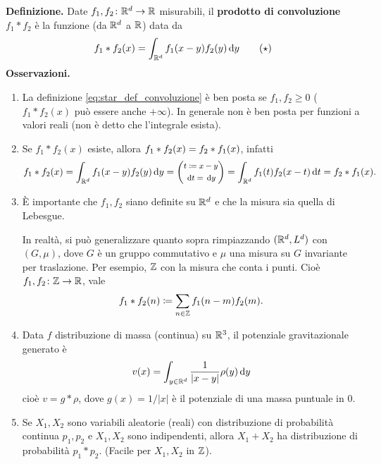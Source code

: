 \documentclass[a4paper, 12pt]{report}
\begin{document}
\textbf{Definizione.} Date $f_1,f_2 \colon  \mathbb R^d \to \mathbb R$ misurabili, il \textbf{prodotto di convoluzione} $f_1 \ast f_2$ è la funzione (da $\mathbb R^d$ a $\mathbb R$) data da
%
\begin{equation} \label{eq:star_def_convoluzione}
	f_1 \ast f_2(x) = \int_{\mathbb R^d} f_1(x-y) f_2(y) \,\mathrm{d} y
	\tag{$\star$}
\end{equation}
%
\textbf{Osservazioni.}
\begin{enumerate}
\item La definizione \eqref{eq:star_def_convoluzione} è ben posta se $f_1,f_2 \geq 0$ ($f_1 \ast f_2(x)$ può essere anche $+\infty$).
In generale non è ben posta per funzioni a valori reali (non è detto che l'integrale esista).

\item Se $f_1 \ast f_2(x)$ esiste, allora $\displaystyle f_1 \ast f_2(x) = f_2 \ast f_1(x)$, infatti
%
$$
f_1 \ast f_2 (x) 
= \int_{\mathbb R^d} f_1(x-y) f_2(y) \,\mathrm{d} y 
= \left( 
{\footnotesize \begin{gathered}
	t \coloneqq x - y \\ 
	\,\mathrm{d} t = \,\mathrm{d} y
\end{gathered}}
\right) =
\int_{\mathbb R^d} f_1(t) f_2(x-t) \,\mathrm{d} t 
= f_2 \ast f_1(x).
$$
%

\item È importante che $f_1,f_2$ siano definite su $\mathbb R^d$ e che la misura sia quella di Lebesgue.

In realtà, si può generalizzare quanto sopra rimpiazzando $(\mathbb R^d, L^d)$ con $(G,\mu)$, dove $G$ è un gruppo commutativo e $\mu$ una misura su $G$ invariante per traslazione. Per esempio, $\mathbb Z$ con la misura che conta i punti. Cioè $f_1,f_2 \colon \mathbb Z \to \mathbb R$, vale
%
$$
f_1 \ast f_2(n) \coloneqq \sum_{n \in \mathbb Z} f_1(n - m) f_2(m).
$$
%

\item Data $f$ distribuzione di massa (continua) su $\mathbb R^3$, il potenziale gravitazionale generato è
%
$$
v(x) = \int_{y \in \mathbb R^d} \frac{1}{\left| x - y \right|} \rho(y) \,\mathrm{d} y
$$
%
cioè $v = g \ast \rho$, dove  $g (x) = 1 / \left| x \right|$ è il potenziale di una massa puntuale in $0$.

\item Se $X_1, X_2$ sono variabili aleatorie (reali) con distribuzione di probabilità continua $p_1,p_2$ e $X_1,X_2$ sono indipendenti, allora $X_1 + X_2$ ha distribuzione di probabilità $p_1 \ast p_2$. (Facile per $X_1,X_2$ in $\mathbb Z$).

\end{enumerate}
\end{document}
